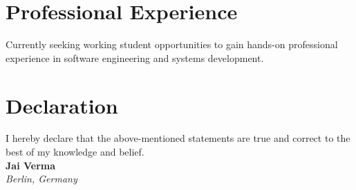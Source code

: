 \documentclass[11pt,a4paper]{article}
\begin{document}
\section*{Professional Experience}
\noindent
Currently seeking working student opportunities to gain hands-on professional experience in software engineering and systems development.

\section*{Declaration}
\noindent
I hereby declare that the above-mentioned statements are true and correct to the best of my knowledge and belief.\\[2em]
\noindent
\textbf{Jai Verma} \\
\textit{Berlin, Germany}
\end{document}
